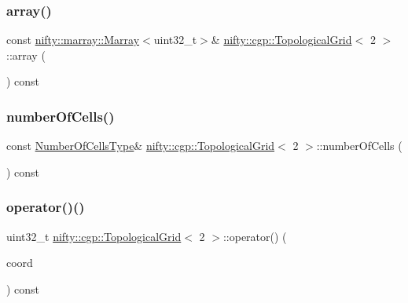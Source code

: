 \subsubsection{\texorpdfstring{array()}{array()}}
{\footnotesize\ttfamily const \hyperlink{classandres_1_1Marray}{nifty\+::marray\+::\+Marray}$<$uint32\+\_\+t$>$\& \hyperlink{classnifty_1_1cgp_1_1TopologicalGrid}{nifty\+::cgp\+::\+Topological\+Grid}$<$ 2 $>$\+::array (\begin{DoxyParamCaption}{ }\end{DoxyParamCaption}) const\hspace{0.3cm}{\ttfamily [inline]}}

\mbox{\label{classnifty_1_1cgp_1_1TopologicalGrid_3_012_01_4_a7ad179c3608eb9b975c2f647bfae8209}} 
\subsubsection{\texorpdfstring{number\+Of\+Cells()}{numberOfCells()}}
{\footnotesize\ttfamily const \hyperlink{classnifty_1_1array_1_1ArrayExtender}{Number\+Of\+Cells\+Type}\& \hyperlink{classnifty_1_1cgp_1_1TopologicalGrid}{nifty\+::cgp\+::\+Topological\+Grid}$<$ 2 $>$\+::number\+Of\+Cells (\begin{DoxyParamCaption}{ }\end{DoxyParamCaption}) const\hspace{0.3cm}{\ttfamily [inline]}}

\mbox{\label{classnifty_1_1cgp_1_1TopologicalGrid_3_012_01_4_aa502cc18faa020ccf8a145a3a1ca0aca}} 
\subsubsection{\texorpdfstring{operator()()}{operator()()}\hspace{0.1cm}{\footnotesize\ttfamily [1/2]}}
{\footnotesize\ttfamily uint32\+\_\+t \hyperlink{classnifty_1_1cgp_1_1TopologicalGrid}{nifty\+::cgp\+::\+Topological\+Grid}$<$ 2 $>$\+::operator() (\begin{DoxyParamCaption}\item[{const \hyperlink{classnifty_1_1array_1_1ArrayExtender}{Coordinate\+Type} \&}]{coord }\end{DoxyParamCaption}) const\hspace{0.3cm}{\ttfamily [inline]}}

